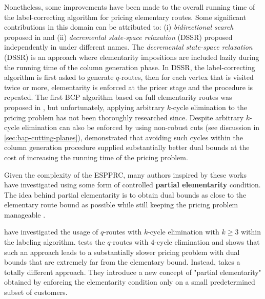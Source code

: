 Nonetheless, some improvements have been made to the overall running time
of the label-correcting algorithm for pricing elementary routes.
Some significant contributions in this domain can be attributed to:
(i) \textit{bidirectional search} proposed in \textcite{righini2006}
and (ii) \textit{decremental state-space relaxation} (DSSR) proposed independently in
\textcite{boland2006, righini2008} under different names.
The \textit{decremental state-space relaxation} (DSSR)
is an approach where elementarity impositions are included lazily
during the running time of the column generation phase.
In DSSR, the label-correcting algorithm
is first asked to generate $q$-routes, then for each vertex that is visited
twice or more, elementarity is enforced at the pricer stage
and the procedure is repeated.
The first BCP algorithm based on full elementarity routes
was proposed in \cite{chabrier2006}, but unfortunately,
applying arbitrary $k$-cycle elimination to the pricing problem
has not been thoroughly researched since.
Despite arbitrary $k$-cycle elimination can also
be enforced by using non-robust cuts (see discussion in \cref{sec:bap-cutting-planes}),
\citeauthor{feillet2004} demonstrated that avoiding such cycles
within the column generation procedure supplied
substantially better dual bounds at the cost
of increasing the running time of the pricing problem.

\medskip

Given the complexity of the ESPPRC,
many authors inspired by these works have investigated using
some form of controlled \textbf{partial elementarity} condition.
The idea behind partial elementarity is to obtain dual bounds
as close to the elementary route bound as possible
while still keeping the pricing problem manageable \parencite{contardo2015}.

\textcite{irnich2006, fukasawa2006} have investigated the usage of
$q$-routes with $k$-cycle elimination with $k \ge 3$ within the labeling algorithm.
\textcite{fukasawa2006} tests the $q$-routes with $4$-cycle elimination
and shows that such an approach leads to a substantially slower pricing problem
with dual bounds that are extremely far from the elementary bound.
Instead, \textcite{desaulniers2008} takes a totally different approach.
They introduce a new concept of "partial elementarity"
obtained by enforcing the elementarity condition
only on a small predetermined subset of customers.

